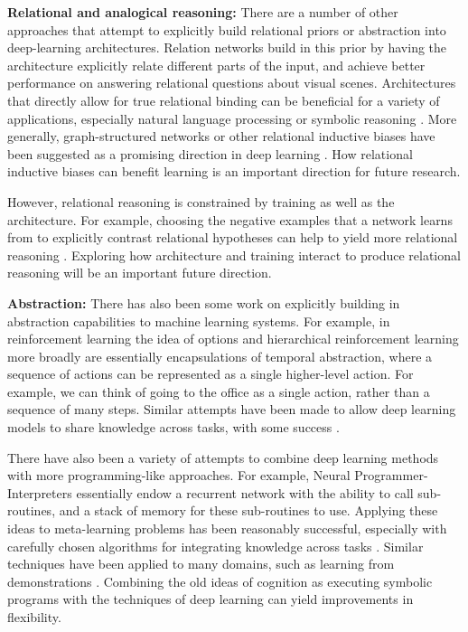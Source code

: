 \textbf{Relational and analogical reasoning:} There are a number of other approaches that attempt to explicitly build relational priors or abstraction into deep-learning architectures. Relation networks \citep{Santoro2017} build in this prior by having the architecture explicitly relate different parts of the input, and achieve better performance on answering relational questions about visual scenes. Architectures that directly allow for true relational binding can be beneficial for a variety of applications, especially natural language processing or symbolic reasoning \citep[e.g.][]{Smolensky1990, Smolensky2014, Huang2017}. More generally, graph-structured networks or other relational inductive biases have been suggested as a promising direction in deep learning \citep{Battaglia2018}. How relational inductive biases can benefit learning is an important direction for future research. \par 
However, relational reasoning is constrained by training as well as the architecture. For example, choosing the negative examples that a network learns from to explicitly contrast relational hypotheses can help to yield more relational reasoning \citep{Hill2019}. Exploring how architecture and training interact to produce relational reasoning will be an important future direction. \par
\textbf{Abstraction:} There has also been some work on explicitly building in abstraction capabilities to machine learning systems. For example, in reinforcement learning the idea of options \citep{Sutton1999} and hierarchical reinforcement learning more broadly \citep[e.g.][]{Botvinick2009} are essentially encapsulations of temporal abstraction, where a sequence of actions can be represented as a single higher-level action. For example, we can think of going to the office as a single action, rather than a sequence of many steps. Similar attempts have been made to allow deep learning models to share knowledge across tasks, with some success \citep[e.g.][]{Tessler2016}. \par 
There have also been a variety of attempts to combine deep learning methods with more programming-like approaches. For example, Neural Programmer-Interpreters \citep{Reed2015} essentially endow a recurrent network with the ability to call sub-routines, and a stack of memory for these sub-routines to use. Applying these ideas to meta-learning problems has been reasonably successful, especially with carefully chosen algorithms for integrating knowledge across tasks \citep[e.g.]{Devlin2017}. Similar techniques have been applied to many domains, such as learning from demonstrations \citep[e.g.][]{Xu2017a}. Combining the old ideas of cognition as executing symbolic programs \citep{Newell1961} with the techniques of deep learning can yield improvements in flexibility. \par  

